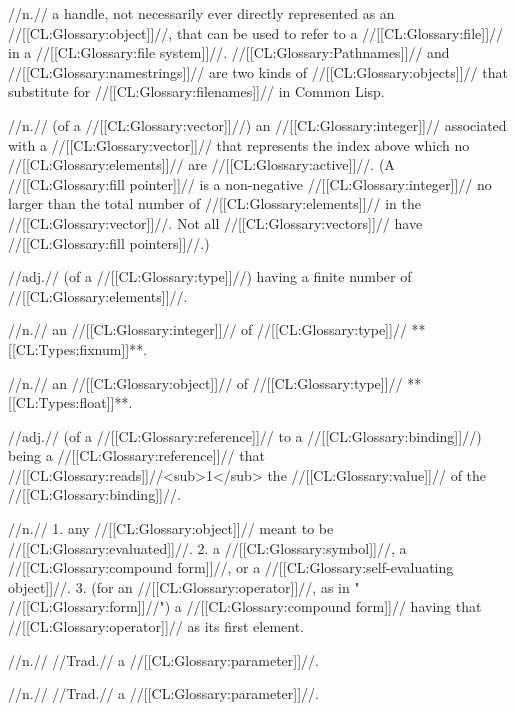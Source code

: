  //n.// a handle, not necessarily ever directly represented as an //[[CL:Glossary:object]]//, that can be used to refer to a //[[CL:Glossary:file]]// in a //[[CL:Glossary:file system]]//. //[[CL:Glossary:Pathnames]]// and //[[CL:Glossary:namestrings]]// are two kinds of //[[CL:Glossary:objects]]// that substitute for //[[CL:Glossary:filenames]]// in Common Lisp. 

 //n.// (of a //[[CL:Glossary:vector]]//) an //[[CL:Glossary:integer]]// associated with a //[[CL:Glossary:vector]]// that represents the index above which no //[[CL:Glossary:elements]]// are //[[CL:Glossary:active]]//. (A //[[CL:Glossary:fill pointer]]// is a non-negative //[[CL:Glossary:integer]]// no larger than the total number of //[[CL:Glossary:elements]]// in the //[[CL:Glossary:vector]]//. Not all //[[CL:Glossary:vectors]]// have //[[CL:Glossary:fill pointers]]//.)
 
 //adj.// (of a //[[CL:Glossary:type]]//) having a finite number of //[[CL:Glossary:elements]]//. 

 //n.// an //[[CL:Glossary:integer]]// of //[[CL:Glossary:type]]// **[[CL:Types:fixnum]]**.

 //n.// an //[[CL:Glossary:object]]// of //[[CL:Glossary:type]]// **[[CL:Types:float]]**.

 //adj.// (of a //[[CL:Glossary:reference]]// to a //[[CL:Glossary:binding]]//) being a //[[CL:Glossary:reference]]// that //[[CL:Glossary:reads]]//<sub>1</sub> the //[[CL:Glossary:value]]// of the //[[CL:Glossary:binding]]//.

 //n.// 1. any //[[CL:Glossary:object]]// meant to be //[[CL:Glossary:evaluated]]//. 2. a //[[CL:Glossary:symbol]]//, a //[[CL:Glossary:compound form]]//, or a //[[CL:Glossary:self-evaluating object]]//. 3. (for an //[[CL:Glossary:operator]]//, as in " //[[CL:Glossary:form]]//") a //[[CL:Glossary:compound form]]// having that //[[CL:Glossary:operator]]// as its first element. 
 
 //n.// //Trad.// a //[[CL:Glossary:parameter]]//.

 //n.// //Trad.// a //[[CL:Glossary:parameter]]//.

